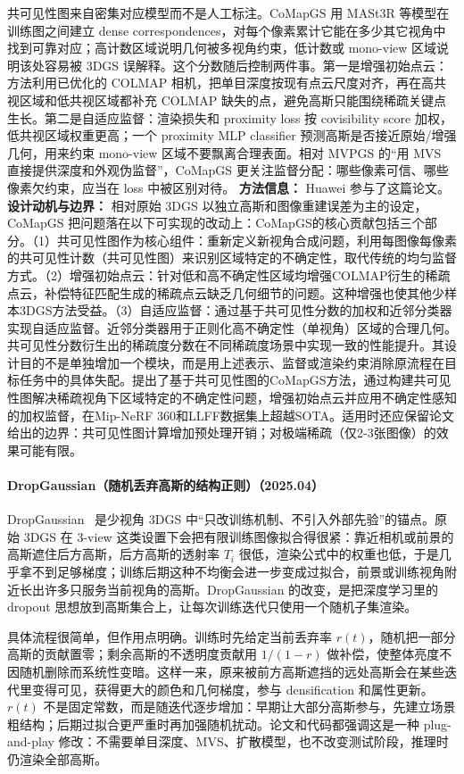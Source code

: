 共可见性图来自密集对应模型而不是人工标注。CoMapGS 用 MASt3R 等模型在训练图之间建立 dense correspondences，对每个像素累计它能在多少其它视角中找到可靠对应；高计数区域说明几何被多视角约束，低计数或 mono-view 区域说明该处容易被 3DGS 误解释。这个分数随后控制两件事。第一是增强初始点云：方法利用已优化的 COLMAP 相机，把单目深度按现有点云尺度对齐，再在高共视区域和低共视区域都补充 COLMAP 缺失的点，避免高斯只能围绕稀疏关键点生长。第二是自适应监督：渲染损失和 proximity loss 按 covisibility score 加权，低共视区域权重更高；一个 proximity MLP classifier 预测高斯是否接近原始/增强几何，用来约束 mono-view 区域不要飘离合理表面。相对 MVPGS 的“用 MVS 直接提供深度和外观伪监督”，CoMapGS 更关注监督分配：哪些像素可信、哪些像素欠约束，应当在 loss 中被区别对待。
\textbf{方法信息：} Huawei 参与了这篇论文。
\textbf{设计动机与边界：} 相对原始 3DGS 以独立高斯和图像重建误差为主的设定，CoMapGS 把问题落在以下可实现的改动上：CoMapGS的核心贡献包括三个部分。（1）共可见性图作为核心组件：重新定义新视角合成问题，利用每图像每像素的共可见性计数（共可见性图）来识别区域特定的不确定性，取代传统的均匀监督方式。（2）增强初始点云：针对低和高不确定性区域均增强COLMAP衍生的稀疏点云，补偿特征匹配生成的稀疏点云缺乏几何细节的问题。这种增强也使其他少样本3DGS方法受益。（3）自适应监督：通过基于共可见性分数的加权和近邻分类器实现自适应监督。近邻分类器用于正则化高不确定性（单视角）区域的合理几何。共可见性分数衍生出的稀疏度分数在不同稀疏度场景中实现一致的性能提升。其设计目的不是单独增加一个模块，而是用上述表示、监督或渲染约束消除原流程在目标任务中的具体失配。提出了基于共可见性图的CoMapGS方法，通过构建共可见性图解决稀疏视角下区域特定的不确定性问题，增强初始点云并应用不确定性感知的加权监督，在Mip-NeRF 360和LLFF数据集上超越SOTA。适用时还应保留论文给出的边界：共可见性图计算增加预处理开销；对极端稀疏（仅2-3张图像）的效果可能有限。
\paragraph{DropGaussian（随机丢弃高斯的结构正则）（2025.04）}
DropGaussian~\cite{2504_00773} 是少视角 3DGS 中“只改训练机制、不引入外部先验”的锚点。原始 3DGS 在 3-view 这类设置下会把有限训练图像拟合得很紧：靠近相机或前景的高斯遮住后方高斯，后方高斯的透射率 $T_i$ 很低，渲染公式中的权重也低，于是几乎拿不到足够梯度；训练后期这种不均衡会进一步变成过拟合，前景或训练视角附近长出许多只服务当前视角的高斯。DropGaussian 的改变，是把深度学习里的 dropout 思想放到高斯集合上，让每次训练迭代只使用一个随机子集渲染。

具体流程很简单，但作用点明确。训练时先给定当前丢弃率 $r(t)$，随机把一部分高斯的贡献置零；剩余高斯的不透明度贡献用 $1/(1-r)$ 做补偿，使整体亮度不因随机删除而系统性变暗。这样一来，原来被前方高斯遮挡的远处高斯会在某些迭代里变得可见，获得更大的颜色和几何梯度，参与 densification 和属性更新。$r(t)$ 不是固定常数，而是随迭代逐步增加：早期让大部分高斯参与，先建立场景粗结构；后期过拟合更严重时再加强随机扰动。论文和代码都强调这是一种 plug-and-play 修改：不需要单目深度、MVS、扩散模型，也不改变测试阶段，推理时仍渲染全部高斯。

